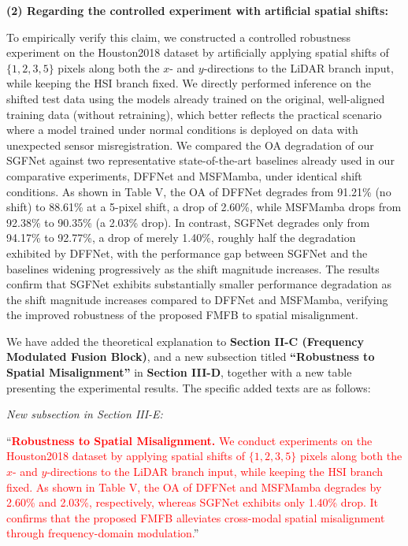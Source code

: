 \textbf{(2) Regarding the controlled experiment with artificial spatial shifts:}

To empirically verify this claim, we constructed a controlled robustness experiment on the Houston2018 dataset by artificially applying spatial shifts of $\{1, 2, 3, 5\}$ pixels along both the $x$- and $y$-directions to the LiDAR branch input, while keeping the HSI branch fixed. We directly performed inference on the shifted test data using the models already trained on the original, well-aligned training data (without retraining), which better reflects the practical scenario where a model trained under normal conditions is deployed on data with unexpected sensor misregistration. We compared the OA degradation of our SGFNet against two representative state-of-the-art baselines already used in our comparative experiments, DFFNet and MSFMamba, under identical shift conditions. As shown in Table V, the OA of DFFNet degrades from 91.21\% (no shift) to 88.61\% at a 5-pixel shift, a drop of 2.60\%, while MSFMamba drops from 92.38\% to 90.35\% (a 2.03\% drop). In contrast, SGFNet degrades only from 94.17\% to 92.77\%, a drop of merely 1.40\%, roughly half the degradation exhibited by DFFNet, with the performance gap between SGFNet and the baselines widening progressively as the shift magnitude increases. The results confirm that SGFNet exhibits substantially smaller performance degradation as the shift magnitude increases compared to DFFNet and MSFMamba, verifying the improved robustness of the proposed FMFB to spatial misalignment.

We have added the theoretical explanation to \textbf{Section II-C (Frequency Modulated Fusion Block)}, and a new subsection titled \textbf{``Robustness to Spatial Misalignment''} in \textbf{Section III-D}, together with a new table presenting the experimental results. The specific added texts are as follows:

\textit{New subsection in Section III-E:}

``\textbf{\textcolor{red}{Robustness to Spatial Misalignment.}} \textcolor{red}{We conduct experiments on the Houston2018 dataset by applying spatial shifts of $\{1, 2, 3, 5\}$ pixels along both the $x$- and $y$-directions to the LiDAR branch input, while keeping the HSI branch fixed. As shown in Table V, the OA of DFFNet and MSFMamba degrades by 2.60\% and 2.03\%, respectively, whereas SGFNet exhibits only 1.40\% drop. It confirms that the proposed FMFB alleviates cross-modal spatial misalignment through frequency-domain modulation.}''

